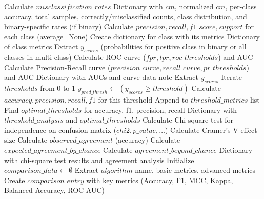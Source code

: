 \begin{algorithm}[!htbp]
\begin{algorithmic}[1]
    \State Calculate $misclassification\_rates$
    \Return Dictionary with $cm$, normalized $cm$, per-class accuracy, total samples, correctly/misclassified counts, class distribution, and binary-specific rates (if binary)
\EndFunction
\Statex
{}
    \State Calculate $precision, recall, f1\_score, support$ for each class (average=None)
        \State Create dictionary for class with its metrics
    \EndFor
    \Return Dictionary of class metrics
\EndFunction
\Statex
{}
    \State Extract $y_{scores}$ (probabilities for positive class in binary or all classes in multi-class)
        \State Calculate ROC curve ($fpr, tpr, roc\_thresholds$) and AUC
        \State Calculate Precision-Recall curve ($precision\_curve, recall\_curve, pr\_thresholds$) and AUC
        \Return Dictionary with AUCs and curve data
    \Else
    \EndIf
\EndFunction
\Statex
{}
     \Return note \EndIf
    \State Extract $y_{scores}$
    \State Iterate $thresholds$ from 0 to 1
        \State $y_{pred\_thresh} \leftarrow (y_{scores} \ge threshold)$
            \State Calculate $accuracy, precision, recall, f1$ for this threshold
            \State Append to $threshold\_metrics$ list
        \EndIf
    \EndFor
    \State Find $optimal\_thresholds$ for accuracy, f1, precision, recall
    \Return Dictionary with $threshold\_analysis$ and $optimal\_thresholds$
\EndFunction
\Statex
{}
    \State Calculate Chi-square test for independence on confusion matrix ($chi2, p\_value, \ldots$)
    \State Calculate Cramer's V effect size
    \State Calculate $observed\_agreement$ (accuracy)
    \State Calculate $expected\_agreement\_by\_chance$
    \State Calculate $agreement\_beyond\_chance$
    \Return Dictionary with chi-square test results and agreement analysis
\EndFunction
\Statex
{}
    \State Initialize $comparison\_data \leftarrow \emptyset$
        \State Extract $algorithm$ name, basic metrics, advanced metrics
        \State Create $comparison\_entry$ with key metrics (Accuracy, F1, MCC, Kappa, Balanced Accuracy, ROC AUC)

\end{algorithmic}
\end{algorithm}

